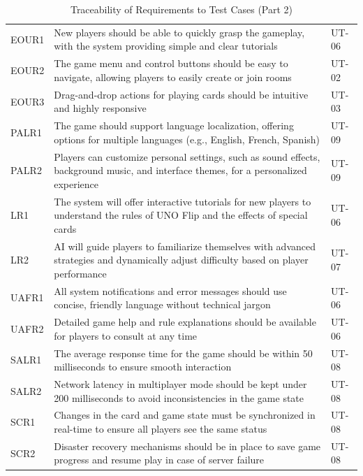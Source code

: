 \documentclass[12pt, titlepage]{article}
\begin{document}
\begin{table}[H]
    \centering
    \begin{tabularx}{\textwidth}{|l|X|l|}
        \hline
        EOUR1 & New players should be able to quickly grasp the gameplay, with the system providing simple and clear tutorials & UT-06 \\
        EOUR2 & The game menu and control buttons should be easy to navigate, allowing players to easily create or join rooms & UT-02 \\
        EOUR3 & Drag-and-drop actions for playing cards should be intuitive and highly responsive & UT-03 \\
        PALR1 & The game should support language localization, offering options for multiple languages (e.g., English, French, Spanish) & UT-09 \\
        PALR2 & Players can customize personal settings, such as sound effects, background music, and interface themes, for a personalized experience & UT-09 \\
        LR1 & The system will offer interactive tutorials for new players to understand the rules of UNO Flip and the effects of special cards & UT-06 \\
        LR2 & AI will guide players to familiarize themselves with advanced strategies and dynamically adjust difficulty based on player performance & UT-07 \\
        UAFR1 & All system notifications and error messages should use concise, friendly language without technical jargon & UT-06 \\
        UAFR2 & Detailed game help and rule explanations should be available for players to consult at any time & UT-06 \\
        SALR1 & The average response time for the game should be within 50 milliseconds to ensure smooth interaction & UT-08 \\
        SALR2 & Network latency in multiplayer mode should be kept under 200 milliseconds to avoid inconsistencies in the game state & UT-08 \\
        SCR1 & Changes in the card and game state must be synchronized in real-time to ensure all players see the same status & UT-08 \\
        SCR2 & Disaster recovery mechanisms should be in place to save game progress and resume play in case of server failure & UT-08 \\
        \hline
    \end{tabularx}
    \caption{Traceability of Requirements to Test Cases (Part 2)}
    \label{tab:trace_requirements_2}
\end{table}
\end{document}
